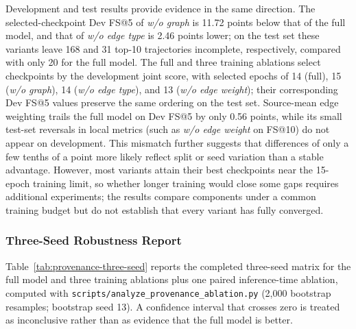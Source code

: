 Development and test results provide evidence in the same direction. The
selected-checkpoint Dev FS@5 of \emph{w/o graph} is 11.72 points below that
of the full model, and that of \emph{w/o edge type} is 2.46 points lower; on the test set these
variants leave 168 and 31 top-10 trajectories incomplete, respectively,
compared with only 20 for the full model. The full and three training
ablations select checkpoints by the development
joint score, with selected epochs of 14 (full), 15 (\emph{w/o graph}), 14
(\emph{w/o edge type}), and 13 (\emph{w/o edge weight}); their corresponding
Dev FS@5 values preserve the same
ordering on the test set. Source-mean edge weighting trails
the full model on Dev FS@5 by only 0.56 points, while its small
test-set reversals in local metrics (such as \emph{w/o edge weight} on
FS@10) do not appear on development. This mismatch further
suggests that differences of only a few tenths of a point more likely
reflect split or seed variation than a stable advantage. However, most
variants attain their best checkpoints near the 15-epoch training limit, so
whether longer training would close some gaps requires additional
experiments; the results compare components under a common training
budget but do not establish that every variant has fully converged.

\subsubsection{Three-Seed Robustness Report}

Table~\ref{tab:provenance-three-seed} reports the completed three-seed matrix
for the full model and three training ablations plus one paired
inference-time ablation, computed with
\texttt{scripts/analyze\_provenance\_ablation.py} (2,000 bootstrap resamples;
bootstrap seed 13). A confidence interval that crosses zero is treated as
inconclusive rather than as evidence that the full model is better.

